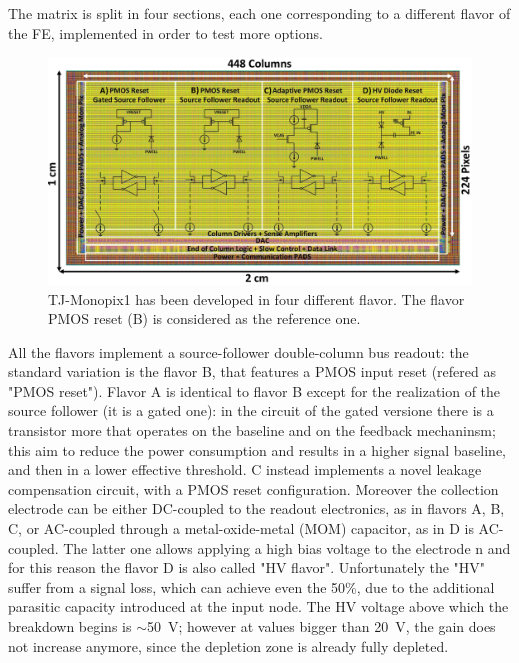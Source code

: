         The matrix is split in four sections, each one corresponding to a different flavor of the FE, implemented in order to test more options. 
        \begin{figure}[h!]
            \centering
            \includegraphics[width=.8\linewidth]{figures/Monopix1/Monopix1_flavors.png}
            \caption{TJ-Monopix1 has been developed in four different flavor. The flavor PMOS reset (B) is considered as the reference one.
            }
            \label{fig:Monopix1_flavors}
        \end{figure}    
        
        All the flavors implement a source-follower double-column bus readout: the standard variation is the flavor B, that features a PMOS input reset (refered as "PMOS reset"). Flavor A is identical to flavor B except for the realization of the source follower (it is a gated one): in the circuit of the gated versione there is a transistor more that operates on the baseline and on the feedback mechaninsm; this aim to reduce the power consumption and results in a higher signal baseline, and then in a lower effective threshold.
        C instead implements a novel leakage compensation circuit, with a PMOS reset configuration. 
        Moreover the collection electrode can be either DC-coupled to the readout electronics, as in flavors A, B, C, or AC-coupled through a metal-oxide-metal (MOM) capacitor, as in D is AC-coupled. The latter one allows applying a high bias voltage to the electrode n and for this reason the flavor D is also called "HV flavor".
        Unfortunately the "HV" suffer from a signal loss, which can achieve even the 50\%, due to the additional parasitic capacity introduced at the input node.  
        The HV voltage above which the breakdown begins is $\sim$\SI{50}{V}; however at values bigger than \SI{20}{V}, the gain does not increase anymore, since the depletion zone is already fully depleted. 


